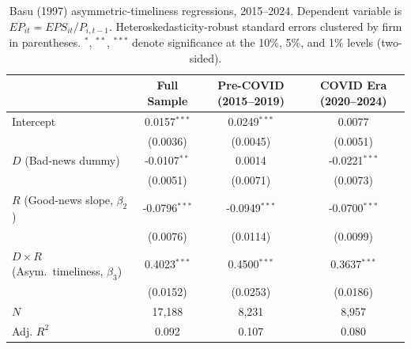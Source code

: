 \begin{table}[H]
\centering
\caption{Basu (1997) asymmetric-timeliness regressions, 2015--2024. Dependent variable is $EP_{it} = \mathit{EPS}_{it} / P_{i,t-1}$. Heteroskedasticity-robust standard errors clustered by firm in parentheses. $^{*}$, $^{**}$, $^{***}$ denote significance at the 10\%, 5\%, and 1\% levels (two-sided).}
\label{tab:basu}
\begin{tabular}{lccc}
\toprule
 & Full Sample & Pre-COVID (2015--2019) & COVID Era (2020--2024) \\
\midrule
Intercept & 0.0157$^{***}$ & 0.0249$^{***}$ & 0.0077 \\
 & (0.0036) & (0.0045) & (0.0051) \\
$D$ (Bad-news dummy) & -0.0107$^{**}$ & 0.0014 & -0.0221$^{***}$ \\
 & (0.0051) & (0.0071) & (0.0073) \\
$R$ (Good-news slope, $\beta_2$) & -0.0796$^{***}$ & -0.0949$^{***}$ & -0.0700$^{***}$ \\
 & (0.0076) & (0.0114) & (0.0099) \\
$D \times R$ (Asym.\ timeliness, $\beta_3$) & 0.4023$^{***}$ & 0.4500$^{***}$ & 0.3637$^{***}$ \\
 & (0.0152) & (0.0253) & (0.0186) \\
\midrule
$N$ & 17,188 & 8,231 & 8,957 \\
Adj. $R^2$ & 0.092 & 0.107 & 0.080 \\
\bottomrule
\end{tabular}
\end{table}